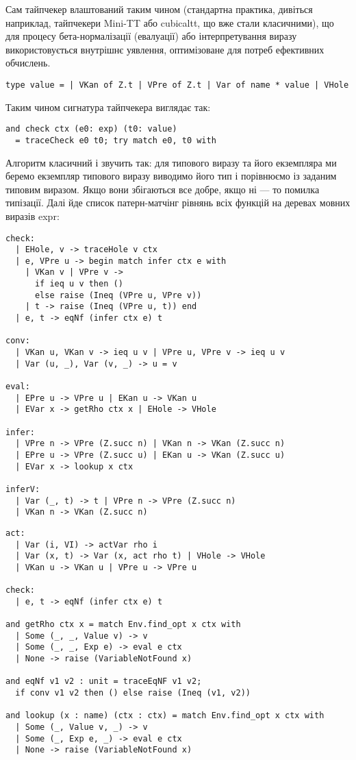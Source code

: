 Сам тайпчекер влаштований таким чином (стандартна практика, дивіться
наприклад, тайпчекери Mini-TT або cubicaltt, що вже стали класичними),
що для процесу бета-нормалізації (евалуації) або інтерпретування виразу
використовується внутрішнє уявлення, оптимізоване для потреб ефективних обчислень.

\begin{lstlisting}
type value = | VKan of Z.t | VPre of Z.t | Var of name * value | VHole
\end{lstlisting}

Таким чином сигнатура тайпчекера виглядає так:

\begin{lstlisting}
and check ctx (e0: exp) (t0: value)
  = traceCheck e0 t0; try match e0, t0 with
\end{lstlisting}

Алгоритм класичний і звучить так: для типового виразу та його
екземпляра ми беремо екземпляр типового виразу виводимо його
тип і порівнюємо із заданим типовим виразом. Якщо вони збігаються
все добре, якщо ні --- то помилка типізації. Далі йде список
патерн-матчінг рівнянь всіх функцій на деревах мовних виразів expr:

\begin{lstlisting}
check:
  | EHole, v -> traceHole v ctx
  | e, VPre u -> begin match infer ctx e with
    | VKan v | VPre v ->
      if ieq u v then ()
      else raise (Ineq (VPre u, VPre v))
    | t -> raise (Ineq (VPre u, t)) end
  | e, t -> eqNf (infer ctx e) t

conv:
  | VKan u, VKan v -> ieq u v | VPre u, VPre v -> ieq u v
  | Var (u, _), Var (v, _) -> u = v

eval:
  | EPre u -> VPre u | EKan u -> VKan u
  | EVar x -> getRho ctx x | EHole -> VHole

infer:
  | VPre n -> VPre (Z.succ n) | VKan n -> VKan (Z.succ n)
  | EPre u -> VPre (Z.succ u) | EKan u -> VKan (Z.succ u)
  | EVar x -> lookup x ctx

inferV:
  | Var (_, t) -> t | VPre n -> VPre (Z.succ n)
  | VKan n -> VKan (Z.succ n)
\end{lstlisting}

\newpage
\begin{lstlisting}
act:
  | Var (i, VI) -> actVar rho i
  | Var (x, t) -> Var (x, act rho t) | VHole -> VHole
  | VKan u -> VKan u | VPre u -> VPre u

check:
  | e, t -> eqNf (infer ctx e) t

and getRho ctx x = match Env.find_opt x ctx with
  | Some (_, _, Value v) -> v
  | Some (_, _, Exp e) -> eval e ctx
  | None -> raise (VariableNotFound x)

and eqNf v1 v2 : unit = traceEqNF v1 v2;
  if conv v1 v2 then () else raise (Ineq (v1, v2))

and lookup (x : name) (ctx : ctx) = match Env.find_opt x ctx with
  | Some (_, Value v, _) -> v
  | Some (_, Exp e, _) -> eval e ctx
  | None -> raise (VariableNotFound x)
\end{lstlisting}

